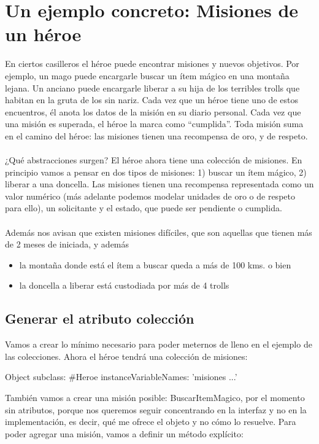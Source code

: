 \documentclass[a4paper,12pt]{book}
\begin{document}
\section{Un ejemplo concreto: Misiones de un héroe}
En ciertos casilleros el héroe puede encontrar misiones y nuevos objetivos. Por ejemplo, un mago puede
encargarle buscar un ítem mágico en una montaña lejana. Un anciano puede encargarle liberar a su hija de
los terribles trolls que habitan en la gruta de los sin nariz. Cada vez que un héroe tiene uno de estos
encuentros, él anota los datos de la misión en su diario personal. Cada vez que una misión es superada,
el héroe la marca como “cumplida”. Toda misión suma en el camino del héroe: las misiones tienen una
recompensa de oro, y de respeto.
\\
\\
¿Qué abstracciones surgen? El héroe ahora tiene una colección de misiones. En principio vamos a pensar en
dos tipos de misiones: 1) buscar un ítem mágico, 2) liberar a una doncella. Las misiones tienen una
recompensa representada como un valor numérico (más adelante podemos modelar unidades de oro o de respeto
para ello), un solicitante y el estado, que puede ser pendiente o cumplida. 
\\
\\
Además nos avisan que existen misiones difíciles, que son aquellas que tienen más de 2 meses de iniciada, 
y además
\begin{itemize}
 \item la montaña donde está el ítem a buscar queda a más de 100 kms. o bien 
 \item la doncella a liberar está custodiada por más de 4 trolls
\end{itemize}

\subsection{Generar el atributo colección}
Vamos a crear lo mínimo necesario para poder meternos de lleno en el ejemplo de las colecciones.
Ahora el héroe tendrá una colección de misiones:

\begin{code}
Object subclass: #Heroe
	instanceVariableNames: 'misiones ...'
\end{code}
\vspace{\baselineskip}

También vamos a crear una misión posible: BuscarItemMagico, por el momento sin atributos, porque nos queremos
seguir concentrando en la interfaz y no en la implementación, es decir, qué me ofrece el objeto y no cómo lo
resuelve.
\newline
\newline
Para poder agregar una misión, vamos a definir un método explícito:
\end{document}
